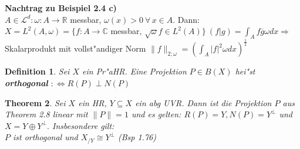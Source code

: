 \documentclass[a4paper,11pt]{book}
\newcommand{\R}{{\mathbb R}}
\newcommand{\C}{{\mathbb C}}
\newcommand{\ssL}{{\mathcal L}}
\newcommand{\begriff}[1]{\textbf{#1}} %
\newcommand{\re}{\ensuremath{\text Re}\,} %
\def\bewhin{\textquotedblleft\ensuremath{\Rightarrow}\textquotedblright: } %
\def\bewrueck{\textquotedblleft\ensuremath{\Leftarrow}\textquotedblright: } %
\newtheorem{Def}{Definition}[chapter]
\newtheorem{Theo}[Def]{Theorem}
\theoremstyle{nonumberplain}
\newtheorem{Bew}{Beweis}
\begin{document}

\textbf{Nachtrag zu Beispiel 2.4 c)}\\
$A \in \ssL^d: \omega: A \rightarrow \R$ messbar, $\omega(x) > 0 \ \forall\, x \in A$. Dann: $X = L^2(A,\omega) = \{ f: A \rightarrow \C$ messbar, $\sqrt{\omega} f \in L^2(A)\} \ (f|g) = \int_A f \overline{g} \omega dx \Rightarrow$ Skalarprodukt mit vollst"andiger Norm $\|f\|_{2; \omega} = \left( \int_A |f|^2 \omega dx \right)^{\frac12}$

\begin{Def}
Sei $X$ ein Pr"aHR. Eine Projektion $P \in B(X)$ hei"st \begriff{orthogonal} $:\Leftrightarrow R(P) \perp N(P)$
\end{Def}


\begin{Theo}
Sei $X$ ein HR, $Y \subseteq X$ ein abg UVR. Dann ist die Projektion $P$ aus Theorem 2.8 linear mit $\|P\| = 1$ und es gelten: $R(P) = Y, N(P) = Y^{\perp}$ und $X = Y \oplus Y^{\perp}.$ Insbesondere gilt:\\
$P$ ist orthogonal und $X_{/ Y} \cong Y^{\perp}$ (Bsp 1.76)
\end{Theo}
\end{document}
